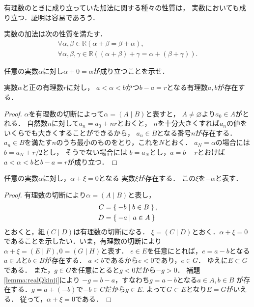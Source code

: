     有理数のときに成り立っていた加法に関する種々の性質は，
    実数においても成り立つ．証明は容易であろう．
    \begin{thm} \label{thm:realsumseisitu}
      実数の加法は次の性質を満たす．
      \begin{align}
        \forall \alpha , \beta \in \mathbb{R} ( \alpha + \beta = \beta + \alpha),
        \label{eq:realsumkoukan} \\
        \forall \alpha , \beta , \gamma \in \mathbb{R}
        ((\alpha + \beta ) + \gamma = \alpha + ( \beta + \gamma)). 
        \label{eq:realsumketugou} 
      \end{align}
    \end{thm}
    \begin{que} \label{que:sumunitele}
      任意の実数$\alpha$に対し$\alpha + 0 = \alpha$が成り立つことを示せ．
    \end{que}

    \begin{lemma} \label{lemma:realQkinji}
      実数$\alpha$と正の有理数$r$に対し，
      $a< \alpha < b$かつ$b-a=r$となる有理数$a,  b$が存在する．
    \end{lemma}
    \begin{proof}
      $\alpha$を有理数の切断によって$\alpha = (A \mid B)$と表すと，
      $A \neq \varnothing$より$a_0 \in A$がとれる．
      自然数$n$に対して$a_n=a_0 + nr$とおくと，
      $n$を十分大きくすれば$a_n$の値をいくらでも大きくすることができるから，
      $a_n \in B$となる番号$n$が存在する．
      $a_n \in B$を満たす$n$のうち最小のものをとり，これを$N$とおく．
      $a_N = \alpha$の場合には$b= a_N + r/2$とし，
      そうでない場合には
      $b=a_N$とし，$a= b-r$とおけば
      $a < \alpha <b$と$b-a =r$が成り立つ．
    \end{proof}

    \begin{thm} \label{thm:sumreverse}
      任意の実数$\alpha$に対し，$\alpha + \xi = 0$となる
      実数$\xi$が存在する．
      この$\xi$を$- \alpha$と表す．
    \end{thm}

    \begin{proof}
      有理数の切断により$\alpha = (A \mid B)$と表し，
      \begin{align*}
        C & = \Set{ -b \mid b \in B } , \\
        D & = \Set{ -a \mid a \in A } 
      \end{align*}
      とおくと，組$(C \mid D)$は有理数の切断になる．
      $\xi = (C \mid D)$とおく．$\alpha + \xi =0$
      であることを示したい．いま，有理数の切断により
      $\alpha + \xi  = ( E \mid F),  0=(G \mid H)$と表す．
      $e \in E$を任意にとれば，$e= a-b$となる
      $a \in A$と$b \in B$が存在する．
      $a<b$であるから$e<0$であり，$e \in G$．
      ゆえに$E \subset G$である．
      また，$g \in G$を任意にとると$g <0$だから$-g >0$．
      補題\ref{lemma:realQkinji}により
      $-g=b-a$，すなわち$g=a-b$となる$a \in A,  b \in B$
      が存在する．$g=a+(-b)$で$-b \in C$だから$g \in E.$
      よって$G \subset E$となり$E=G$がいえる．
      従って，$\alpha + \xi =0$である．
    \end{proof}

